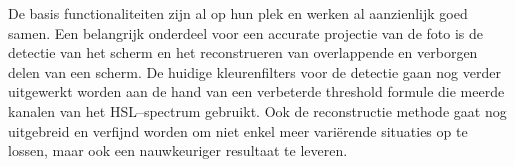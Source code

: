 De basis functionaliteiten zijn al op hun plek en werken al aanzienlijk goed samen. Een belangrijk onderdeel voor een accurate projectie van de foto is de detectie van het scherm en het reconstrueren van overlappende en verborgen delen van een scherm. De huidige kleurenfilters voor de detectie gaan nog verder uitgewerkt worden aan de hand van een verbeterde threshold formule die meerde kanalen van het HSL--spectrum gebruikt. Ook de reconstructie methode gaat nog uitgebreid en verfijnd worden om niet enkel meer variërende situaties op te lossen, maar ook een nauwkeuriger resultaat te leveren.
